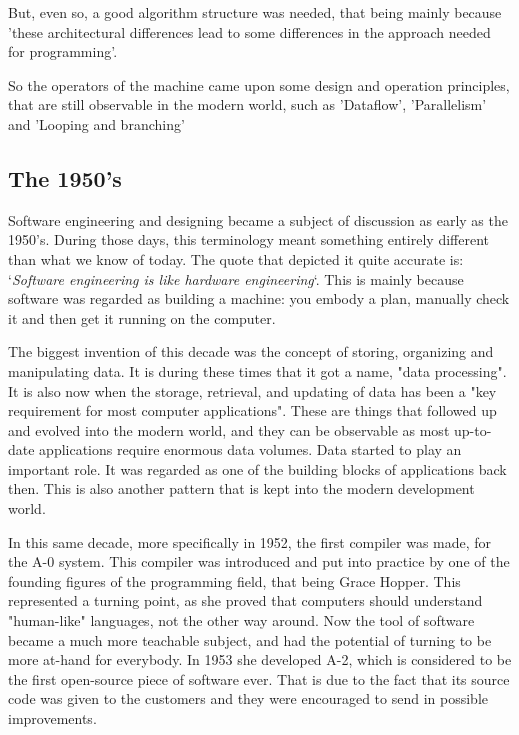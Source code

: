 \par
But, even so, a good algorithm structure was needed, that being mainly because 'these architectural differences lead to some differences in the approach needed for programming'\cite{eniacDesign}.

So the operators of the machine came upon some design and operation principles, that are still observable in the modern world, such as 'Dataflow', 'Parallelism' and 'Looping and branching' \cite{eniacDesign}

\subsection{The 1950's}

\par
Software engineering and designing became a subject of discussion as early as the 1950's.
During those days, this terminology meant something entirely different than what we know of today.
The quote that depicted it quite accurate is: `\textit{Software engineering is like hardware engineering}`\cite{boehmb06}.
This is mainly because software was regarded as building a machine: you embody a plan, manually check it and then get it running on the computer.

\par
The biggest invention of this decade was the concept of storing, organizing and manipulating data.
It is during these times that it got a name, "data processing"\cite{firstDBMS}.
It is also now when the storage, retrieval, and updating of data has been a "key requirement for most computer applications"\cite{firstDBMS}.
These are things that followed up and evolved into the modern world, and they can be observable as most up-to-date applications require enormous data volumes.
Data started to play an important role.
It was regarded as one of the building blocks of applications back then.
This is also another pattern that is kept into the modern development world.

\par
In this same decade, more specifically in 1952, the first compiler was made, for the A-0 system.
This compiler was introduced and put into practice by one of the founding figures of the programming field, that being Grace Hopper.
This represented a turning point, as she proved that computers should understand "human-like" languages\cite{a0compiler}, not the other way around.
Now the tool of software became a much more teachable subject, and had the potential of turning to be more at-hand for everybody.
In 1953 she developed A-2, which is considered to be the first open-source piece of software ever.
That is due to the fact that its source code was given to the customers and they were encouraged to send in possible improvements.

